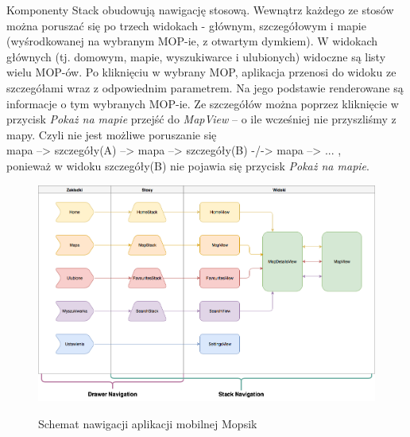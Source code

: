 Komponenty Stack obudowują nawigację stosową. Wewnątrz każdego ze stosów można poruszać się po trzech widokach - głównym, szczegółowym i mapie (wyśrodkowanej na wybranym MOP-ie, z otwartym dymkiem). W widokach głównych (tj. domowym, mapie, wyszukiwarce i ulubionych) widoczne są listy wielu MOP-ów. Po kliknięciu w wybrany MOP, aplikacja przenosi do widoku ze szczegółami wraz z odpowiednim parametrem. Na jego podstawie renderowane są informacje o tym wybranych MOP-ie. Ze szczegółów można poprzez kliknięcie w przycisk \textit{Pokaż na mapie} przejść do \textit{MapView} -- o ile wcześniej nie przyszliśmy z mapy. \newline Czyli nie jest możliwe poruszanie się\\	\indent mapa --> szczegóły(A) --> mapa --> szczegóły(B) -/-> mapa --> ... ,\\ponieważ w widoku szczegóły(B) nie pojawia się przycisk \textit{Pokaż na mapie}.


\begin{figure}[!htb]
\includegraphics[width=\textwidth]{images/mopsik_mobile_navigation.png} \label{mopsik-nav}
\caption{Schemat nawigacji aplikacji mobilnej Mopsik}
\end{figure}

